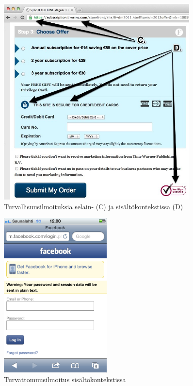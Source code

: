 \documentclass[finnish,gradu]{tktltiki}
\begin{document}
  \begin{figure}
    \centering
    \includegraphics[width=0.9\textwidth]{images/trust_context_html.jpg}
    \caption{Turvallisuusilmoituksia selain- (C) ja sisältökontekstissa (D)}
    \label{fig:trust_context_html}
  \end{figure}


  \begin{figure}
    \centering
    \includegraphics[width=0.5\textwidth]{images/trust_context_html_unsecure.png}
    \caption{Turvattomuusilmoitus sisältökontekstissa}
    \label{fig:trust_context_html_unsecure}
  \end{figure}
\end{document}

